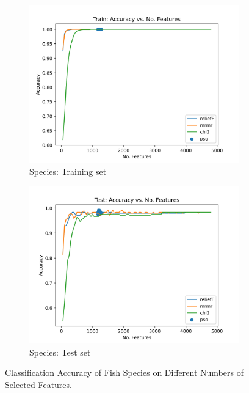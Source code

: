 \documentclass[runningheads]{llncs}
\begin{document}
\begin{figure}[t]
  \centering
  \begin{subfigure}[b]{.45\linewidth}
    \includegraphics[width=\linewidth]{accuracy-features-fish-train.png}
    \caption{Species: Training set}\label{fig:fs-per-k-fish-train}
  \end{subfigure}
  \begin{subfigure}[b]{.45\linewidth}
    \includegraphics[width=\linewidth]{accuracy-features-fish-test.png}
    \caption{Species: Test set}\label{fig:fs-per-k-fish-test}
  \end{subfigure}
  \caption[Two numerical solutions]{
    Classification Accuracy of Fish Species on Different Numbers of Selected Features.
  }
  \label{fig:fs-per-k-fish}
\end{figure}
\end{document}

